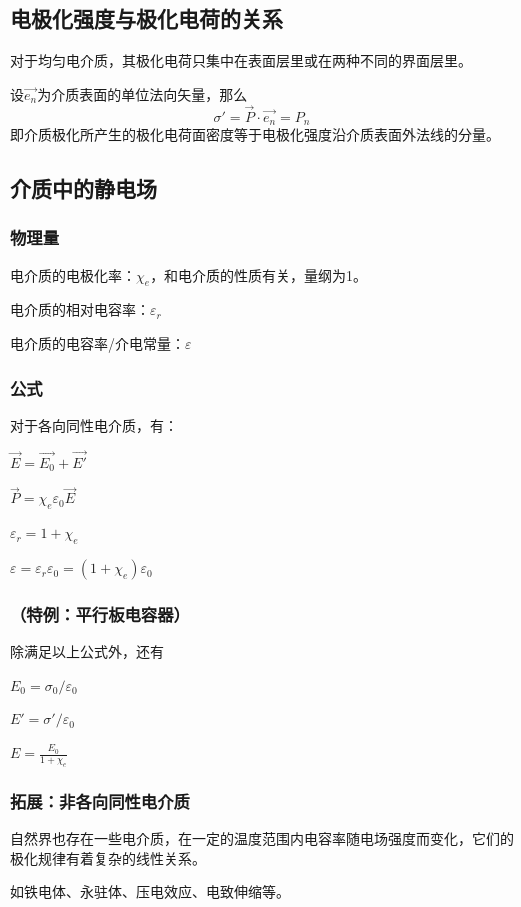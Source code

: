 \subsection{电极化强度与极化电荷的关系}
对于均匀电介质，其极化电荷只集中在表面层里或在两种不同的界面层里。

设$\vec{e_n}$为介质表面的单位法向矢量，那么
$$\sigma'=\vec{P}\cdot\vec{e_n}=P_n$$
即介质极化所产生的极化电荷面密度等于电极化强度沿介质表面外法线的分量。

\subsection{介质中的静电场}
\subsubsection{物理量}
电介质的电极化率：$\chi_e$，和电介质的性质有关，量纲为1。

电介质的相对电容率：$\varepsilon_r$

电介质的电容率/介电常量：$\varepsilon$

\subsubsection{公式}
对于各向同性电介质，有：

$\vec{E}=\vec{E_0}+\vec{E'}$

$\vec{P}=\chi_e\varepsilon_0\vec{E}$

$\varepsilon_r=1+\chi_e$

$\varepsilon=\varepsilon_r\varepsilon_0=(1+\chi_e)\varepsilon_0$

\subsubsection{（特例：平行板电容器）}
除满足以上公式外，还有

$E_0=\sigma_0/\varepsilon_0$

$E'=\sigma'/\varepsilon_0$

$E=\frac{E_0}{1+\chi_e}$

\subsubsection{拓展：非各向同性电介质}
自然界也存在一些电介质，在一定的温度范围内电容率随电场强度而变化，它们的极化规律有着复杂的线性关系。

如铁电体、永驻体、压电效应、电致伸缩等。